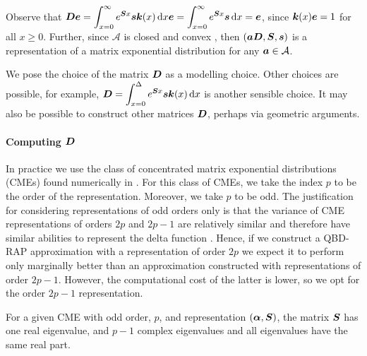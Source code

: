 Observe that \(\boldsymbol D\boldsymbol e = \displaystyle \int_{x=0}^\infty e^{\boldsymbol S x }\boldsymbol s \boldsymbol k(x)\, \mathrm{d} x\boldsymbol e =\displaystyle \int_{x=0}^\infty e^{\boldsymbol S x }\boldsymbol s \, \mathrm{d} x=\boldsymbol e\), since \(\boldsymbol k(x)\boldsymbol e = 1\) for all \(x\geq 0\). Further, since \(\mathcal A\) is closed and convex \citep{MEinAP}, then \((\boldsymbol a \boldsymbol D,\boldsymbol S,\boldsymbol s)\) is a representation of a matrix exponential distribution for any \(\boldsymbol a\in\mathcal A\). 

We pose the choice of the matrix \(\boldsymbol D\) as a modelling choice. Other choices are possible, for example, \(\displaystyle \boldsymbol D = \int_{x=0}^{\Delta}e^{\boldsymbol S x }\boldsymbol s \boldsymbol k(x)\, \mathrm{d} x\) is another sensible choice. It may also be possible to construct other matrices \(\boldsymbol D\), perhaps via geometric arguments. 

\paragraph{Computing \(\boldsymbol D\)}
In practice we use the class of concentrated matrix exponential distributions (CMEs) found numerically in \citep{hht2020}. For this class of CMEs, we take the index \(p\) to be the order of the representation. Moreover, we take \(p\) to be odd. The justification for considering representations of odd orders only is that the variance of CME representations of orders \(2p\) and \(2p-1\) are relatively similar and therefore have similar abilities to represent the delta function \citep{hht2020}. Hence, if we construct a QBD-RAP approximation with a representation of order \(2p\) we expect it to perform only marginally better than an approximation constructed with representations of order \(2p-1\). However, the computational cost of the latter is lower, so we opt for the order \(2p-1\) representation. 

For a given CME with odd order, \(p\), and representation \((\boldsymbol\alpha,\boldsymbol S)\), the matrix \(\boldsymbol S\) has one real eigenvalue, and \(p-1\) complex eigenvalues and all eigenvalues have the same real part. 


